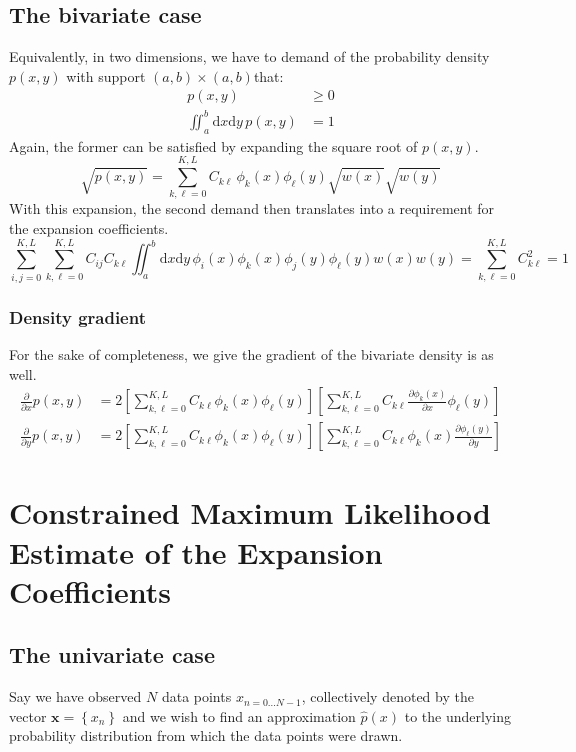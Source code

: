 \documentclass[]{report}
\begin{document}
	\section{The bivariate case}
	Equivalently, in two dimensions, we have to demand of the probability density $p(x,y)$ with support $(a,b)\times(a,b)$that:
	\begin{align}
		p(x, y) & \ge 0 \\
		\iint_a^b\mathrm{d}x\mathrm{d}y\,p(x,y) & = 1 
	\end{align}
	Again, the former can be satisfied by expanding the square root of $p(x,y)$.
	\begin{equation}
		\sqrt{p(x,y)} = \sum_{k, \ell=0}^{K, L}C_{k\ell}\,\phi_k(x)\phi_\ell(y)\sqrt{w(x)}\sqrt{w(y)}
	\end{equation}
	With this expansion, the second demand then translates into a requirement for the expansion coefficients.
	\begin{equation}
		\sum_{i, j=0}^{K, L}\sum_{k, \ell=0}^{K, L}C_{ij}C_{k\ell} \iint_a^b\mathrm{d}x\mathrm{d}y\,\phi_i(x)\phi_k(x)\phi_j(y)\phi_\ell(y)w(x)w(y) = \sum_{k, \ell=0}^{K, L}C_{k\ell}^2 = 1
	\end{equation}
	
		\subsection{Density gradient}
		For the sake of completeness, we give the gradient of the bivariate density is as well.
		\begin{align}
			\frac{\partial}{\partial x}p(x, y) & = 2\left[\sum_{k,\ell=0}^{K,L}C_{k\ell}\phi_k(x)\phi_\ell(y)\right]\left[\sum_{k,\ell=0}^{K,L}C_{k\ell}\frac{\partial\phi_k(x)}{\partial x}\phi_\ell(y)\right] \\
			\frac{\partial}{\partial y}p(x, y) & = 2\left[\sum_{k,\ell=0}^{K,L}C_{k\ell}\phi_k(x)\phi_\ell(y)\right]\left[\sum_{k,\ell=0}^{K,L}C_{k\ell}\phi_k(x)\frac{\partial\phi_\ell(y)}{\partial y}\right] \nonumber
		\end{align}

\chapter{Constrained Maximum Likelihood Estimate of the Expansion Coefficients}
	\section{The univariate case}
	Say we have observed $N$ data points $x_{n=0\ldots N-1}$, collectively denoted by the vector $\mathbf{x}=\left\{x_n\right\}$ and we wish to find an approximation $\hat{p}(x)$ to the underlying probability distribution from which the data points were drawn.
	
\end{document}
